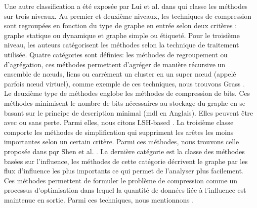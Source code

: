Une autre classification a été exposée par Lui et al. dans \citep{liu2018graph} qui classe les méthodes sur trois niveaux. Au premier et deuxième niveaux, les techniques de compression sont regroupées en fonction du type de graphe en entrée selon deux critères : graphe statique ou dynamique et graphe simple ou étiqueté. Pour le troisième niveau, les auteurs catégorisent les méthodes selon la technique de traitement utilisée. Quatre catégories sont définies: les méthodes de regroupement ou d'agrégation, ces méthodes permettent d'agréger de manière récursive un ensemble de nœuds, liens ou carrément un cluster en un super nœud (appelé parfois nœud virtuel), comme exemple de ces techniques, nous trouvons Grass \citep{lefevre2010grass}. Le deuxième type de méthodes englobe les méthodes de compression de bits. Ces méthodes minimisent le nombre de bits nécessaires au stockage du graphe en se basant sur 
le principe de description minimal (\gls{mdl} en Anglais). Elles peuvent être avec ou sans perte. Parmi elles, nous citons LSH-based \citep{khan2014set}. La troisième classe comporte les méthodes de simplification qui suppriment les arêtes les moins importantes selon un certain critère. Parmi ces méthodes, nous trouvons celle proposée dans pqr Shen et al. \citep{shen2006visual}. La dernière catégorie est la classe des méthodes basées sur l'influence, les méthodes de cette catégorie décrivent le graphe par les flux d'influence les plus importants ce qui permet de l'analyser plus facilement. Ces méthodes permettent de formuler le problème de compression comme un processus d'optimisation dans lequel la quantité de données liée à l'influence est maintenue en sortie. Parmi ces techniques, nous mentionnons \citep{shi2015vegas}.\\


